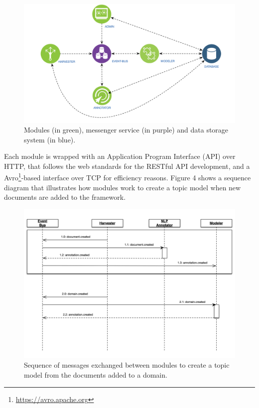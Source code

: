 \begin{figure} 
  \center
  \includegraphics[scale=0.45]{modules}
  \caption{Modules (in green), messenger service (in purple) and data storage system (in blue).}
  \label{fig:librairy-modules}
\end{figure}


Each module is wrapped with an Application Program Interface (API) over HTTP, that follows the web standards for the RESTful API development, and a Avro\footnote{\url{https://avro.apache.org}}-based interface over TCP for efficiency reasons. Figure 4 shows a sequence diagram that illustrates how modules work to create a topic model when new documents are added to the framework. 

\begin{figure} 
  \center
  \includegraphics[scale=0.45]{librairy-sequence.png}
  \caption{Sequence of messages exchanged between modules to create a topic model from the documents added to a domain.}
  \label{fig:librairy-sequence}
\end{figure}




